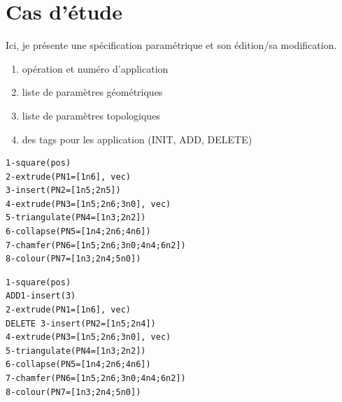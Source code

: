 \section{Cas d'étude}
\label{sec:reevaluation-base-regles-cas-etude}


Ici, je présente une spécification paramétrique et son édition/sa modification.
\begin{enumerate}
	\item opération et numéro d'application
	\item liste de paramètres géométriques
	\item liste de paramètres topologiques
	\item des tags pour les application (INIT, ADD, DELETE)
\end{enumerate}

%


%
{\footnotesize\ttfamily
	\begin{lstlisting}[label=lst:reevaluation-regles-specification-parametrique-spec-init,caption=Spécification paramétrique initiale]
1-square(pos)
2-extrude(PN1=[1n6], vec)
3-insert(PN2=[1n5;2n5])
4-extrude(PN3=[1n5;2n6;3n0], vec)
5-triangulate(PN4=[1n3;2n2])
6-collapse(PN5=[1n4;2n6;4n6])
7-chamfer(PN6=[1n5;2n6;3n0;4n4;6n2])
8-colour(PN7=[1n3;2n4;5n0])
\end{lstlisting}}

{\footnotesize\ttfamily
	\begin{lstlisting}[label=lst:reevaluation-regles-specification-parametrique-spec-modif,caption=Spécification paramétrique modifiée]
1-square(pos)
ADD1-insert(3)
2-extrude(PN1=[1n6], vec)
DELETE 3-insert(PN2=[1n5;2n4])
4-extrude(PN3=[1n5;2n6;3n0], vec)
5-triangulate(PN4=[1n3;2n2])
6-collapse(PN5=[1n4;2n6;4n6])
7-chamfer(PN6=[1n5;2n6;3n0;4n4;6n2])
8-colour(PN7=[1n3;2n4;5n0])
\end{lstlisting}}


